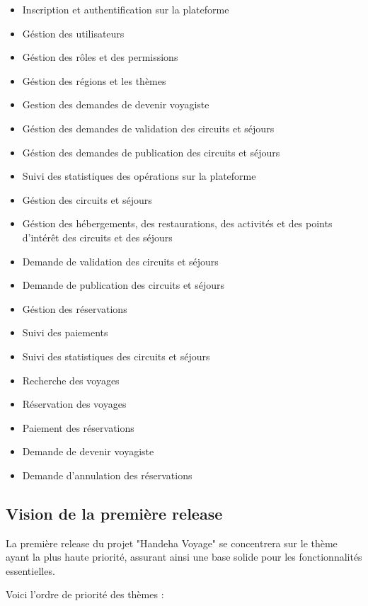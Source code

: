 \documentclass[12pt]{report}
\begin{document}
				\begin{itemize}
					\item Inscription et authentification sur la plateforme
					\item Géstion des utilisateurs
					\item Géstion des rôles et des permissions
					\item Géstion des régions et les thèmes 							
					\item Gestion des demandes de devenir voyagiste
					\item Géstion des demandes de validation des circuits et séjours
					\item Géstion des demandes de publication des circuits et séjours 											
					\item Suivi des statistiques des opérations sur la plateforme
					\item Géstion des circuits et séjours
					\item Géstion des hébergements, des restaurations, des activités et des points d'intérêt des circuits et des séjours
					\item Demande de validation des circuits et séjours
					\item Demande de publication des circuits et séjours
					\item Géstion des réservations
					\item Suivi des paiements
					\item Suivi des statistiques des circuits et séjours
					\item Recherche des voyages
					\item Réservation des voyages
					\item Paiement des réservations
					\item Demande de devenir voyagiste							
					\item Demande d'annulation des réservations
				\end{itemize}

				\subsection{Vision de la première release}

				\hspace{15pt} La première release du projet "Handeha Voyage" se concentrera sur le thème ayant la plus haute priorité, assurant ainsi une base solide pour les fonctionnalités essentielles.

				Voici l'ordre de priorité des thèmes :
\end{document}
